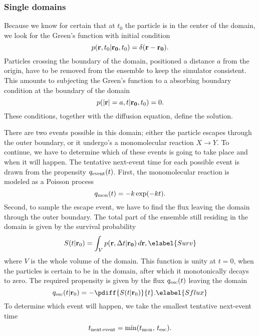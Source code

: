 \subsubsection{Single domains}
Because we know for certain that at $t_0$ the particle is in the center of the domain, we look for the Green's function with initial condition
\begin{equation}
 p({\bf r}, t_0|{\bf r_0},t_0) = \delta(\mathbf{r - r_0}).
\end{equation}
Particles crossing the boundary of the domain, positioned a distance $a$ from the origin, have to be removed from the ensemble to keep the simulator consistent. This amounts to subjecting the Green's function to a absorbing boundary condition at the boundary of the domain
\begin{equation}
 p({\bf |r|}=a, t|{\bf r_0},t_0) = 0.
\end{equation}
These conditions, together with the diffusion equation, define the solution. \cite{Carslaw1959}\cite{Beck1992} 

There are two events possible in this domain; either the particle escapes through the outer boundary, or it undergo's a monomolecular reaction $X\rightarrow Y$. To continue, we have to determine which of these events is going to take place and when it will happen. The tentative next-event time for each possible event is drawn from the propensity $q_{\rm event}(t)$. First, the monomolecular reaction is modeled as a Poisson process
\begin{equation}
 q_{\rm mon}(t) = -k\, {\rm exp}(-k t).
\end{equation}
Second, to sample the escape event, we have to find the flux leaving the domain through the outer boundary. The total part of the ensemble still residing in the domain is given by the survival probability
\begin{equation}
 S(t|{\mathbf r_0}) = \int_V p({\bf r}, \Delta t|{\bf r_0}) \, d{\mathbf r},
 \elabel{Surv}
\end{equation}
where $V$ is the whole volume of the domain. This function is unity at $t=0$, when the particles is certain to be in the domain, after which it monotonically decays to zero. The required propensity is given by the flux $q_{\rm esc}(t)$ leaving the domain
\begin{equation}
 q_{\rm esc}(t|{\mathbf r_0}) = -\pdiff{S(t|{\mathbf r_0})}{t}.
 \elabel{Sflux}
\end{equation}
To determine which event will happen, we take the smallest tentative next-event time
\begin{equation}
 t_{\rm next\,event} = {\rm min}(t_{\rm mon},\,t_{\rm esc}).
\end{equation}

